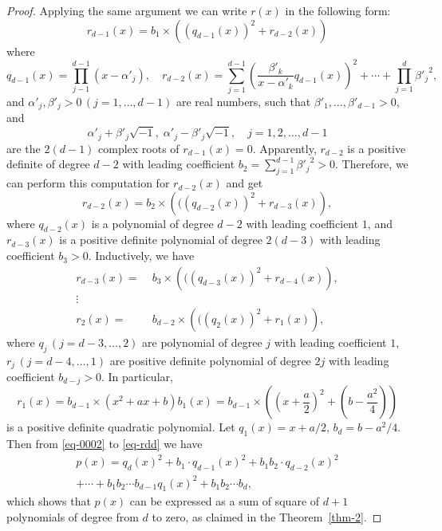 \documentclass[runningheads]{llncs}
\begin{document}
\begin{proof}
Applying the same argument we can write 
$r(x)$ in the following form:
\begin{equation}
r_{d-1}(x)=b_1\times \left(\left(q_{d-1}(x)\right)^2+r_{d-2}(x)\right)
\label{eq-rd1}
\end{equation}
where
$$
q_{d-1}(x)= \prod_{j-1}^{d-1}(x-\alpha'_j),\quad 
r_{d-2}(x)=
\sum_{j=1}^{d-1}\left(\frac{\beta'_k}
{x-\alpha'_k}q_{d-1}(x) \right)^2+\cdots+\prod_{j=1}^{d} {\beta'_j}^2,
$$ 
and $\alpha'_j,\beta'_j>0\,(j=1,\ldots,d-1)$ are real numbers, such that $\beta'_1,\ldots,\beta'_{d-1}>0$, and  
$$
\alpha'_j+\beta'_j\sqrt{-1}, \;
\alpha'_j-\beta'_j\sqrt{-1}, \quad j=1,2,\ldots,d-1
$$
are the $2(d-1)$ complex roots of $r_{d-1}(x)=0$. Apparently, $r_{d-2}$ is a positive definite of degree $d-2$ with leading coefficient $b_2=\sum_{j=1}^{d-1}{\beta'_j}^2>0$. Therefore, we can perform this computation for $r_{d-2}(x)$ and get
\begin{equation}
r_{d-2}(x)=b_2\times \left(
(\left(q_{d-2}(x)\right)^2+r_{d-3}(x)
\right),
\label{eq-rd2}
\end{equation}
where $q_{d-2}(x)$ is a polynomial of degree $d-2$ with leading coefficient $1$, and $r_{d-3}(x)$ is a positive definite polynomial of degree $2(d-3)$ with leading coefficient $b_3>0$. 
Inductively, we have
\begin{align}
r_{d-3}(x)=&\;b_3\times \left(
(\left(q_{d-3}(x)\right)^2+r_{d-4}(x)
\right),
\label{eq-rd3}\\
\vdots\;&\nonumber \\
r_{2}(x)=&\;b_{d-2}\times \left(
(\left(q_{2}(x)\right)^2+r_{1}(x)
\right),
\label{eq-rdj}
\end{align}
where $q_{j}\,(j=d-3,\ldots,2)$ are polynomial of degree $j$ with leading coefficient $1$, 
$r_{j}\,(j=d-4,\ldots,1)$ are  positive definite polynomial of degree $2j$ with leading coefficient $b_{d-j}>0$.  In particular,
\begin{equation}
r_1(x)=b_{d-1}\times (x^2+ax+b)
b_1(x)=b_{d-1}\times \left(\left(x+\frac{a}{2}\right)^2+
(b-\frac{a^2}{4})\right)
\label{eq-rdd}
\end{equation}
is a positive definite quadratic polynomial. Let $q_1(x)=x+a/2$, $b_d=b-a^2/4$. Then from \eqref{eq-0002} to \eqref{eq-rdd} we have
\begin{align}
p(x)=q_d(x)^2
+b_1\cdot q_{d-1}(x)^2
+b_1b_2\cdot q_{d-2}(x)^2\nonumber \\
+\cdots+b_1b_2\cdots b_{d-1}q_1(x)^2+
b_1b_2\cdots b_d,
\end{align}
which shows that $p(x)$ can be expressed as a sum of square of $d+1$ polynomials of degree from $d$ to zero, as claimed in the Theorem~\ref{thm-2}.  


\end{proof}
\end{document}
